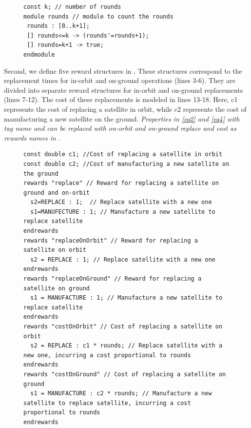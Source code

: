 \begin{figure}[htbp]            
\begin{minipage}{9cm}
\begin{lstlisting}[style=framed,%customc, 
caption=Rounds Module,
 	label=lst:rounds]	
const k; // number of rounds
module rounds // module to count the rounds
 rounds : [0..k+1];
 [] rounds<=k -> (rounds'=rounds+1);
 [] rounds=k+1 -> true;
endmodule
\end{lstlisting}
 \end{minipage}  
\end{figure}

Second, we define five reward structures in . These structures correspond to the replacement times for in-orbit and on-ground operations (lines 3-6). They are divided into separate reward structures for in-orbit and on-ground replacements (lines 7-12). The cost of these replacements is modeled in lines 13-18. Here, c1 represents the cost of replacing a satellite in orbit, while c2 represents the cost of manufacturing a new satellite on the ground. \emph{Properties in \ref{eq2} and \ref{eq4} with tag name  and  can be replaced with on-orbit and on-ground replace and cost as rewards names in }.

\begin{figure}[htbp]            
\begin{minipage}{9cm}
\begin{lstlisting}[style=framed,%customc, 
caption=Reward Structures in PRISM,
 	label=lst:cost]	
const double c1; //Cost of replacing a satellite in orbit
const double c2; //Cost of manufacturing a new satellite on the ground
rewards "replace" // Reward for replacing a satellite on ground and on-orbit
  s2=REPLACE : 1;  // Replace satellite with a new one
  s1=MANUFECTURE : 1; // Manufacture a new satellite to replace satellite 
endrewards
rewards "replaceOnOrbit" // Reward for replacing a satellite on orbit
  s2 = REPLACE : 1; // Replace satellite with a new one
endrewards
rewards "replaceOnGround" // Reward for replacing a satellite on ground
  s1 = MANUFACTURE : 1; // Manufacture a new satellite to replace satellite 
endrewards
rewards "costOnOrbit" // Cost of replacing a satellite on orbit
  s2 = REPLACE : c1 * rounds; // Replace satellite with a new one, incurring a cost proportional to rounds
endrewards
rewards "costOnGround" // Cost of replacing a satellite on ground
  s1 = MANUFACTURE : c2 * rounds; // Manufacture a new satellite to replace satellite, incurring a cost proportional to rounds
endrewards
\end{lstlisting}
 \end{minipage}  
\end{figure}


